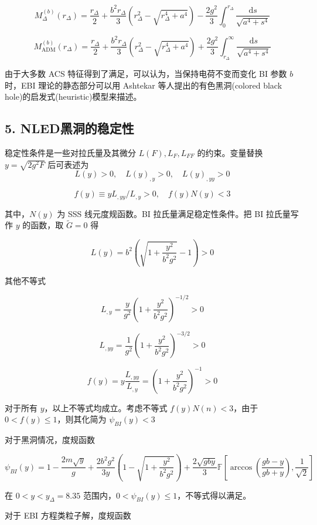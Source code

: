 \documentclass[aps,prl,preprint,groupedaddress]{revtex4-2}
\begin{document}
$$
M_\Delta^{(b)}(r_\Delta)
=\frac{r_\Delta }{2 } + \frac{b^2 r_\Delta }{3 } \left(r_\Delta^2 - \sqrt{r_\Delta^4 + a^4} \right) - \frac{2g^2 }{3 } \int_0^{r_\Delta} \frac{\mathrm{d}s }{\sqrt{a^4+s^4} } 
$$

$$
M_{\mathrm{ADM}}^{(b)}(r_\Delta)
=\frac{r_\Delta }{2 } + \frac{b^2 r_\Delta }{3 } \left(r_\Delta^2 - \sqrt{r_\Delta^4 + a^4} \right) + \frac{2g^2 }{3 } \int_{r_\Delta}^{\infty} \frac{\mathrm{d}s }{\sqrt{a^4+s^4} }
$$

由于大多数 ACS 特征得到了满足，可以认为，当保持电荷不变而变化 BI 参数 $b$ 时，EBI 理论的静态部分可以用 Ashtekar 等人提出的有色黑洞(colored black hole)的启发式(heuristic)模型来描述。


\subsection{5. NLED黑洞的稳定性}

稳定性条件是一些对拉氏量及其微分 $L(F),L_F,L_{FF}$ 的约束。变量替换 $y=\sqrt{2g^2 F}$ 后可表述为
$$
L(y)>0,\quad
L(y)_{,y}>0,\quad
L(y)_{,yy}>0 
$$

$$
f(y)
\equiv yL_{,yy} / L_{,y} > 0,\quad
f(y) N(y) < 3    
$$

其中，$N(y)$ 为 SSS 线元度规函数。BI 拉氏量满足稳定性条件。把 BI 拉氏量写作 $y$ 的函数，取 $\tilde{G}=0$ 得

$$
L(y)
=b^2\left(\sqrt{1+\frac{y^2 }{b^2 g^2 } } - 1 \right) > 0 
$$

其他不等式

$$
L_{,y} = \frac{y }{g^2 } \left(1 + \frac{y^2 }{b^2 g^2 }  \right)^{-1/2} > 0
$$

$$
L_{,yy} = \frac{1 }{g^2 } \left(1 + \frac{y^2 }{b^2 g^2 }  \right)^{-3/2} > 0
$$

$$
f(y) = y\frac{L_{,yy} }{L_{,y} } = \left(1 + \frac{y^2 }{b^2 g^2 }  \right)^{-1} > 0
$$

对于所有 $y$，以上不等式均成立。考虑不等式 $f(y)N(n)<3$，由于 $0<f(y)\leq 1$，则其化简为 $\psi_{BI}(y)<3$

对于黑洞情况，度规函数

$$
\psi_{BI}(y)
=1-\frac{2m\sqrt{y} }{g } + \frac{2b^2 g^2 }{3y } \left(1-\sqrt{1+\frac{y^2 }{b^2 g^2 } } \right) + \frac{2\sqrt{gby} }{3 } \mathbb{F}\left[\arccos\left(\frac{gb-y }{gb+y } \right), \frac{1 }{\sqrt{2} }   \right] 
$$

在 $0<y<y_\Delta=8.35$ 范围内，$0<\psi_{BI}(y)\leq 1$，不等式得以满足。

对于 EBI 方程类粒子解，度规函数
\end{document}
